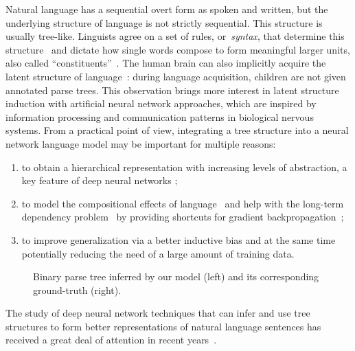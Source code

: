 \documentclass{article} \usepackage{iclr2019_conference,times}
\begin{document}
Natural language has a sequential overt form as spoken and written, but the underlying structure of language is not strictly sequential. This structure is usually tree-like. Linguists agree on a set of rules, or~\emph{syntax}, that determine this structure~\citep{chomsky1956three,chomsky1965,sandra2014morphological} and dictate how single words compose to form meaningful larger units, also called ``constituents''~\citep{koopman2013introduction}.
The human brain can also implicitly acquire the latent structure of language~\citep{dehaene2015neural}: during language acquisition, children are not given annotated parse trees.
This observation brings more interest in latent structure induction with artificial neural network approaches, which are inspired by information processing and communication patterns in biological nervous systems. From a practical point of view, integrating a tree structure into a neural network language model may be important for multiple reasons:
\begin{enumerate}[label=(\roman*)]
    \item to obtain a hierarchical representation with increasing levels of abstraction, a key feature of deep neural networks \citep{bengio2009learning, lecun2015deep, schmidhuber2015deep};
    \item to model the compositional effects of language~\citep{koopman2013introduction,socher2013recursive} and help with the long-term dependency problem~\citep{bengio2009learning,tai2015improved} by providing shortcuts for gradient backpropagation~\citep{chung2016hierarchical};
    \item to improve generalization via a better inductive bias and at the same time potentially reducing the need of a large amount of training data.
\end{enumerate}
\begin{figure}[t]
\centering
	\vspace{0.3em}
	\caption{Binary parse tree inferred by our model (left) and its corresponding ground-truth (right).}
\end{figure}
The study of deep neural network techniques that can infer and use tree structures
to form better representations of natural language sentences has received a great deal of attention in recent years~\citep{bowman2016fast,yogatama2016learning, shen2017neural,jacob2018learning,choi2018learning,williams2018latent,shi2018tree}.
\end{document}
